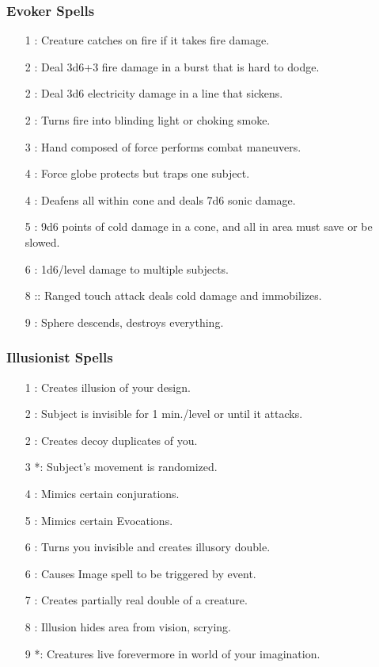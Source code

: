 \subsubsection{Evoker Spells}
\begin{itemize}
\item[1] : Creature catches on fire if it takes fire damage.
\item[2] : Deal 3d6+3 fire damage in a burst that is hard to dodge.
\item[2] : Deal 3d6 electricity damage in a line that sickens.
\item[2] : Turns fire into blinding light or choking smoke.
\item[3] : Hand composed of force performs combat maneuvers.
\item[4] : Force globe protects but traps one subject.
\item[4] : Deafens all within cone and deals 7d6 sonic damage.
\item[5] : 9d6 points of cold damage in a cone, and all in area must save or be slowed.
\item[6] : 1d6/level damage to multiple subjects.
\item[8] :: Ranged touch attack deals cold damage and immobilizes.
\item[9] : Sphere descends, destroys everything.
\end{itemize}
\subsubsection{Illusionist Spells}
\begin{itemize}
\item[1] : Creates illusion of your design.
\item[2] : Subject is invisible for 1 min./level or until it attacks.
\item[2] : Creates decoy duplicates of you.
\item[3] *: Subject's movement is randomized.
\item[4] : Mimics certain conjurations.
\item[5] : Mimics certain Evocations.
\item[6] : Turns you invisible and creates illusory double.
\item[6] : Causes Image spell to be triggered by event.
\item[7] : Creates partially real double of a creature.
\item[8] : Illusion hides area from vision, scrying.
\item[9] *: Creatures live forevermore in world of your imagination.
\end{itemize}
